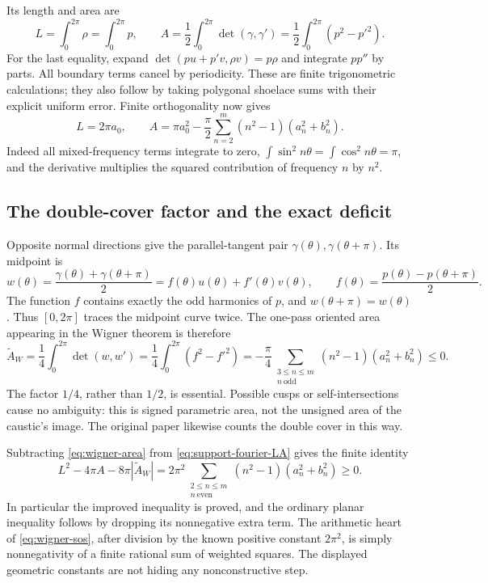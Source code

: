 Its length and area are
\begin{equation}\label{eq:support-LA}
 L=\int_0^{2\pi}\rho=\int_0^{2\pi}p,
 \qquad
 A=\frac12\int_0^{2\pi}\det(\gamma,\gamma')
  =\frac12\int_0^{2\pi}(p^2-p'^2).
\end{equation}
For the last equality, expand \(\det(pu+p'v,\rho v)=p\rho\)
and integrate \(pp''\) by parts.  All boundary terms cancel by
periodicity.  These are finite trigonometric calculations; they
also follow by taking polygonal shoelace sums with their explicit
uniform error.  Finite orthogonality now gives
\begin{equation}\label{eq:support-fourier-LA}
 L=2\pi a_0,\qquad
 A=\pi a_0^2-\frac\pi2
       \sum_{n=2}^m(n^2-1)(a_n^2+b_n^2).
\end{equation}
Indeed all mixed-frequency terms integrate to zero,
\(\int\sin^2n\theta=\int\cos^2n\theta=\pi\), and the derivative
multiplies the squared contribution of frequency \(n\) by \(n^2\).

\subsection{The double-cover factor and the exact deficit}
Opposite normal directions give the parallel-tangent pair
\(\gamma(\theta),\gamma(\theta+\pi)\).  Its midpoint is
\[
 w(\theta)=\frac{\gamma(\theta)+\gamma(\theta+\pi)}2
          =f(\theta)u(\theta)+f'(\theta)v(\theta),
 \qquad f(\theta)=\frac{p(\theta)-p(\theta+\pi)}2.
\]
The function \(f\) contains exactly the odd harmonics of \(p\),
and \(w(\theta+\pi)=w(\theta)\).  Thus \([0,2\pi]\) traces
the midpoint curve twice.  The one-pass oriented area appearing in
the Wigner theorem is therefore
\begin{equation}\label{eq:wigner-area}
 \widetilde A_W
  =\frac14\int_0^{2\pi}\det(w,w')
  =\frac14\int_0^{2\pi}(f^2-f'^2)
  =-\frac\pi4
       \sum_{\substack{3\le n\le m\\n\ \text{odd}}}
        (n^2-1)(a_n^2+b_n^2)\le0.
\end{equation}
The factor \(1/4\), rather than \(1/2\), is essential.
Possible cusps or self-intersections cause no ambiguity: this is
signed parametric area, not the unsigned area of the caustic's image.
The original paper likewise counts the double cover in this way.

Subtracting \eqref{eq:wigner-area} from
\eqref{eq:support-fourier-LA} gives the finite identity
\begin{equation}\label{eq:wigner-sos}
 \boxed{L^2-4\pi A-8\pi|\widetilde A_W|
   =2\pi^2
       \sum_{\substack{2\le n\le m\\n\ \text{even}}}
        (n^2-1)(a_n^2+b_n^2)\ge0.}
\end{equation}
In particular the improved inequality is proved, and the ordinary
planar inequality follows by dropping its nonnegative extra term.
The arithmetic heart of \eqref{eq:wigner-sos}, after division by
the known positive constant \(2\pi^2\), is simply nonnegativity
of a finite rational sum of weighted squares.  The displayed
geometric constants are not hiding any nonconstructive step.

